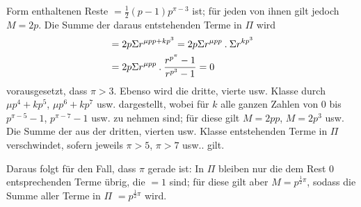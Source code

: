 Form enthaltenen Reste $=\frac12(p-1)p^{\pi-3}$ ist; für jeden von ihnen gilt jedoch $M=2p$. Die Summe der daraus entstehenden Terme in $\Pi$ wird
\[
\begin{aligned}
&=2p\Sigma r^{\mu pp+kp^3}=2p\Sigma r^{\mu pp}\mathbin{.}\Sigma r^{kp^3}\\
&=2p\Sigma r^{\mu pp}\mathbin{.}\frac{r^{p^\pi}-1}{r^{p^3}-1}=0
\end{aligned}
\]
vorausgesetzt, dass $\pi>3$. Ebenso wird die dritte, vierte usw. Klasse durch $\mu p^4+kp^5$, $\mu p^6+kp^7$ usw. dargestellt, wobei für $k$ alle ganzen Zahlen von $0$ bis $p^{\pi-5}-1$, $p^{\pi-7}-1$ usw. zu nehmen sind; für diese gilt $M=2pp$, $M=2p^3$ usw. Die Summe der aus der dritten, vierten usw. Klasse entstehenden Terme in $\Pi$ verschwindet, sofern jeweils $\pi>5$, $\pi>7$ usw.. gilt.
\par Daraus folgt für den Fall, dass $\pi$ gerade ist: In $\Pi$ bleiben nur die dem Rest $0$ entsprechenden Terme übrig, die $=1$ sind; für diese gilt aber $M=p^{\frac12\pi}$, sodass die Summe aller Terme in $\Pi$ $=p^{\frac12\pi}$ wird.
